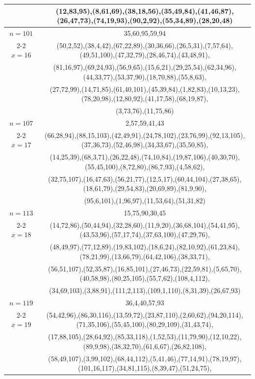 \begin{tabular}{| c | c |}
&(12,83,95),(8,61,69),(38,18,56),(35,49,84),(41,46,87),(26,47,73),(74,19,93),(90,2,92),(55,34,89),(28,20,48)\\
\hline 
\(n=101\) & 
35,60,95,59,94\\
\cline{2-2}
\(x=16\)
&(50,2,52),(38,4,42),(67,22,89),(30,36,66),(26,5,31),(7,57,64),(49,51,100),(47,32,79),(28,46,74),(43,48,91),\\
&(81,16,97),(69,24,93),(56,9,65),(15,6,21),(29,25,54),(62,34,96),(44,33,77),(53,37,90),(18,70,88),(55,8,63),\\
&(27,72,99),(14,71,85),(61,40,101),(45,39,84),(1,82,83),(10,13,23),(78,20,98),(12,80,92),(41,17,58),(68,19,87),\\
&(3,73,76),(11,75,86)\\
\hline 
\(n=107\) & 
2,57,59,41,43\\
\cline{2-2}
\(x=17\)
&(66,28,94),(88,15,103),(42,49,91),(24,78,102),(23,76,99),(92,13,105),(37,36,73),(52,46,98),(34,33,67),(35,50,85),\\
&(14,25,39),(68,3,71),(26,22,48),(74,10,84),(19,87,106),(40,30,70),(55,45,100),(8,72,80),(86,7,93),(4,58,62),\\
&(32,75,107),(16,47,63),(56,21,77),(12,5,17),(60,44,104),(27,38,65),(18,61,79),(29,54,83),(20,69,89),(81,9,90),\\
&(95,6,101),(1,96,97),(11,53,64),(51,31,82)\\
\hline 
\(n=113\) & 
15,75,90,30,45\\
\cline{2-2}
\(x=18\)
&(14,72,86),(50,44,94),(32,28,60),(11,9,20),(36,68,104),(54,41,95),(43,53,96),(57,17,74),(37,63,100),(47,29,76),\\
&(48,49,97),(77,12,89),(19,83,102),(18,6,24),(82,10,92),(61,23,84),(78,21,99),(13,66,79),(64,42,106),(38,33,71),\\
&(56,51,107),(52,35,87),(16,85,101),(27,46,73),(22,59,81),(5,65,70),(40,58,98),(80,25,105),(55,7,62),(108,4,112),\\
&(34,69,103),(3,88,91),(111,2,113),(109,1,110),(8,31,39),(26,67,93)\\
\hline 
\(n=119\) & 
36,4,40,57,93\\
\cline{2-2}
\(x=19\)
&(54,42,96),(86,30,116),(13,59,72),(23,87,110),(2,60,62),(94,20,114),(71,35,106),(55,45,100),(80,29,109),(31,43,74),\\
&(17,88,105),(28,64,92),(85,33,118),(1,52,53),(11,79,90),(12,10,22),(89,9,98),(38,32,70),(61,6,67),(26,82,108),\\
&(58,49,107),(3,99,102),(68,44,112),(5,41,46),(77,14,91),(78,19,97),(101,16,117),(34,81,115),(8,39,47),(51,24,75),\\

\end{tabular}
